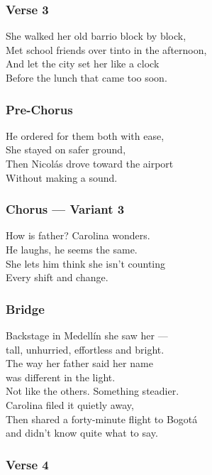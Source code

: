 \subsubsection{Verse 3}\label{verse-3-8}

She walked her old barrio block by block,\\
Met school friends over tinto in the afternoon,\\
And let the city set her like a clock\\
Before the lunch that came too soon.

\subsubsection{Pre-Chorus}\label{pre-chorus-20}

He ordered for them both with ease,\\
She stayed on safer ground,\\
Then Nicolás drove toward the airport\\
Without making a sound.

\subsubsection{Chorus --- Variant 3}\label{chorus-variant-3}

How is father? Carolina wonders.\\
He laughs, he seems the same.\\
She lets him think she isn't counting\\
Every shift and change.

\subsubsection{Bridge}\label{bridge-13}

Backstage in Medellín she saw her ---\\
tall, unhurried, effortless and bright.\\
The way her father said her name\\
was different in the light.\\
Not like the others. Something steadier.\\
Carolina filed it quietly away,\\
Then shared a forty-minute flight to Bogotá\\
and didn't know quite what to say.

\subsubsection{Verse 4}\label{verse-4-4}

